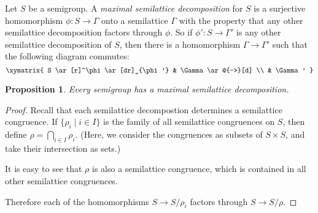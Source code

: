 \documentclass[12pt]{article}
\newtheorem*{proposition}{Proposition}
\begin{document}
Let $S$ be a semigroup.  A \emph{maximal semilattice decomposition} for $S$ is a surjective homomorphism $\phi \colon S \to \Gamma$ onto a semilattice $\Gamma$ with the property that any other semilattice decomposition factors through $\phi$.  So if $\phi' \colon S \to \Gamma'$ is any other semilattice decomposition of $S$, then there is a homomorphism $\Gamma \to \Gamma'$ such that the following diagram commutes:
$$\xymatrix{
S \ar[r]^\phi \ar[dr]_{\phi'} & \Gamma \ar@{-->}[d] \\ & \Gamma'
}$$

\begin{proposition}
Every semigroup has a maximal semilattice decomposition.
\end{proposition}

\begin{proof}
Recall that each semilattice decompostion determines a semilattice congruence.  If $\{ \rho_i \mid i \in I \}$ is the family of all semilattice congruences on $S$, then define $\rho = \bigcap_{i \in I} \rho_i$.  (Here, we consider the congruences as subsets of $S \times S$, and take their intersection as sets.)

It is easy to see that $\rho$ is also a semilattice congruence, which is contained in all other semilattice congruences.

Therefore each of the homomorphisms $S \to S/\rho_i$ factors through $S \to S/\rho$.
\end{proof}
\end{document}
